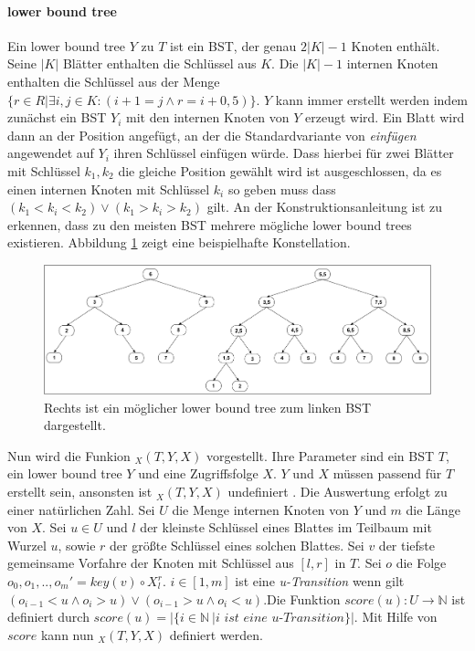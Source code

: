 \documentclass[a4paper,12pt]{article}
\begin{document}
\paragraph{lower bound tree} \label{wilberLowerBoundTree}
Ein lower bound tree $Y$ zu $T$ ist ein BST, der genau $2 \vert K\vert  - 1$ Knoten enthält. Seine $\vert K \vert$ Blätter enthalten die Schlüssel aus $K$. Die $\vert K \vert - 1$ internen Knoten enthalten die Schlüssel aus der Menge $\{r \in R \vert \exists i,j \in K \colon \left( i + 1 = j \land r = i + 0,5\right)\}$. $Y$ kann immer erstellt werden indem zunächst ein BST $Y_i$ mit den internen Knoten von $Y$ erzeugt wird. Ein Blatt wird dann an der Position angefügt, an der die Standardvariante von \textit{einfügen} angewendet auf $Y_i$ ihren Schlüssel einfügen würde. Dass hierbei für zwei Blätter mit Schlüssel $k_1, k_2$ die gleiche Position gewählt wird ist ausgeschlossen, da es einen internen Knoten mit Schlüssel $k_i$ so geben muss dass $\left(k_1 < k_i < k_2\right) \lor \left(k_1 > k_i > k_2 \right)$ gilt. An der Konstruktionsanleitung ist zu erkennen, dass zu den meisten BST mehrere mögliche lower bound trees existieren. Abbildung \ref{fig:lowerBoundTree} zeigt eine beispielhafte Konstellation. \\


        
\begin{figure}[h]
	\centering
	\includegraphics[width=1\textwidth]{"Medien/DynOpt/lowerBoundTree"}
	\caption{Rechts ist ein möglicher lower bound tree zum linken BST dargestellt.  }
	\label{fig:lowerBoundTree}
\end{figure}

\noindent Nun wird die Funkion $_X(T, Y, X) $ vorgestellt. Ihre Parameter sind ein BST $T$, ein lower bound tree $Y$ und eine Zugriffsfolge $X$. $Y$ und $X$ müssen passend für $T$ erstellt sein, ansonsten ist $_X(T, Y, X) $ undefiniert . Die Auswertung erfolgt zu einer natürlichen Zahl. Sei $U$ die Menge internen Knoten von $Y$ und $m$ die Länge von $X$. Sei $u \in U$ und $l$ der kleinste Schlüssel eines Blattes im Teilbaum mit Wurzel $u$, sowie $r$ der größte Schlüssel eines solchen Blattes. Sei $v$ der tiefste gemeinsame Vorfahre der Knoten mit Schlüssel aus $\left[l, r\right]$  in $T$. Sei $o$ die Folge $o_0, o_1,..,{o_m}' =  \mathit{key}(v) \circ X^r_l$. $i \in \left[1,m\right]$ ist eine \textit{u-Transition} wenn gilt $\left( o_{i-1} < u \land o_i > u \right) \lor \left( o_{i-1} > u \land o_i < u \right)$.Die Funktion $\mathit{score}\left(u\right) \colon U \rightarrow \mathbb{N}$ ist definiert durch $\mathit{score}\left(u\right) = \vert\{i \in \mathbb{N}\ \vert \textit{i ist eine u-Transition}\} \vert$. Mit Hilfe von $\mathit{score}$ kann nun  $_X(T, Y, X) $ definiert werden.
\end{document}
